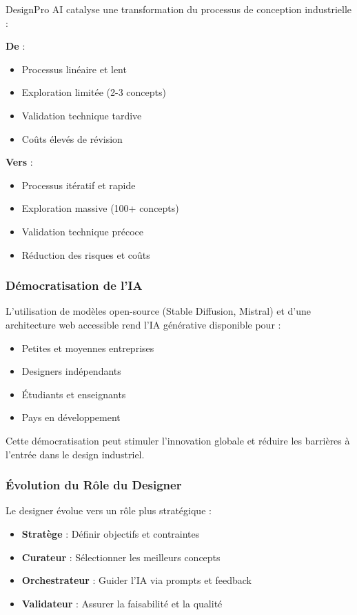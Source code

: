 DesignPro AI catalyse une transformation du processus de conception industrielle :

\textbf{De} :
\begin{itemize}[leftmargin=*]
    \item Processus linéaire et lent
    \item Exploration limitée (2-3 concepts)
    \item Validation technique tardive
    \item Coûts élevés de révision
\end{itemize}

\textbf{Vers} :
\begin{itemize}[leftmargin=*]
    \item Processus itératif et rapide
    \item Exploration massive (100+ concepts)
    \item Validation technique précoce
    \item Réduction des risques et coûts
\end{itemize}

\subsubsection{Démocratisation de l'IA}

L'utilisation de modèles open-source (Stable Diffusion, Mistral) et d'une architecture web accessible rend l'IA générative disponible pour :

\begin{itemize}[leftmargin=*]
    \item Petites et moyennes entreprises
    \item Designers indépendants
    \item Étudiants et enseignants
    \item Pays en développement
\end{itemize}

Cette démocratisation peut stimuler l'innovation globale et réduire les barrières à l'entrée dans le design industriel.

\subsubsection{Évolution du Rôle du Designer}

Le designer évolue vers un rôle plus stratégique :

\begin{itemize}[leftmargin=*]
    \item \textbf{Stratège} : Définir objectifs et contraintes
    \item \textbf{Curateur} : Sélectionner les meilleurs concepts
    \item \textbf{Orchestrateur} : Guider l'IA via prompts et feedback
    \item \textbf{Validateur} : Assurer la faisabilité et la qualité
\end{itemize}


